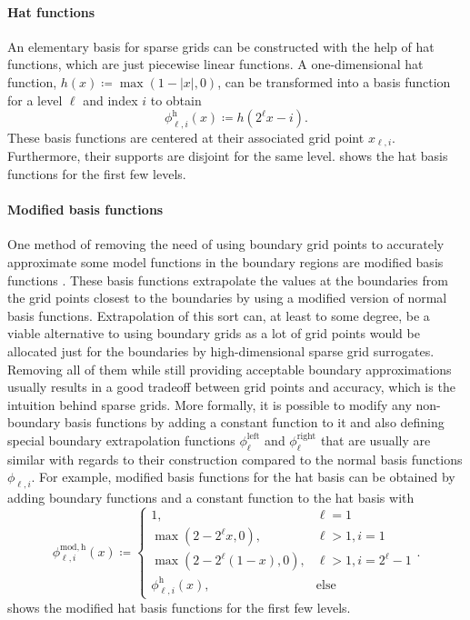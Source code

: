 \documentclass[
  a4paper,  %
  twoside,  %
  bibliography=totoc,
  headsepline,
  cleardoublepage=empty,
  parskip=half,
  draft=false
]{scrbook}
\begin{document}
\paragraph{Hat functions}
An elementary basis for sparse grids can be constructed with the help of hat functions, which are just piecewise linear functions.
A one-dimensional hat function, $h(x) \coloneqq \max(1 - |x|,0)$, can be transformed into a basis function for a level $\ell$ and index $i$ to obtain
\begin{equation}
\phi^\mathrm{h}_{\ell,i}(x) \coloneqq h(2^\ell x-i).
\end{equation}
These basis functions are centered at their associated grid point $x_{\ell,i}$.
Furthermore, their supports are disjoint for the same level.
 shows the hat basis functions for the first few levels.

\paragraph{Modified basis functions}
One method of removing the need of using boundary grid points to accurately approximate some model functions in the boundary regions are modified basis functions \cite{Pflueger2010}.
These basis functions extrapolate the values at the boundaries from the grid points closest to the boundaries by using a modified version of normal basis functions.
Extrapolation of this sort can, at least to some degree, be a viable alternative to using boundary grids as a lot of grid points would be allocated just for the boundaries by high-dimensional sparse grid surrogates.
Removing all of them while still providing acceptable boundary approximations usually results in a good tradeoff between grid points and accuracy, which is the intuition behind sparse grids.
More formally, it is possible to modify any non-boundary basis functions by adding a constant function to it and also defining special boundary extrapolation functions $\phi^{\text{left}}_{\ell}$ and $\phi^{\text{right}}_{\ell}$ that are usually are similar with regards to their construction compared to the normal basis functions $\phi_{\ell,i}$.
For example, modified basis functions for the hat basis can be obtained by adding boundary functions and a constant function to the hat basis with
\begin{equation}
\phi^{\mathrm{mod,h}}_{\ell,i}(x) \coloneqq
\begin{cases}
1,& \ell=1\\
\max(2 - 2^\ell x, 0),& \ell>1, i=1\\
\max(2 - 2^\ell (1 - x), 0),& \ell>1, i=2^\ell - 1\\
\phi^{\mathrm{h}}_{\ell,i}(x),& \text{else}
\end{cases}.
\end{equation}
 shows the modified hat basis functions for the first few levels.
\end{document}
